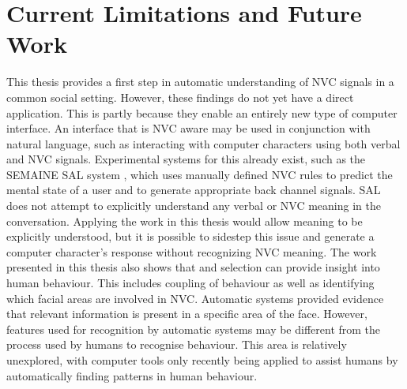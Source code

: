 

\section{Current Limitations and Future Work}

This thesis provides a first step in automatic understanding of \ac{NVC} signals in a common social setting. However, these findings do not yet have a direct application. This is partly because they enable an entirely new type of computer interface.
An interface that is \ac{NVC} aware may be used in conjunction with natural language, such as interacting with computer characters using both verbal and \ac{NVC} signals. Experimental systems for this already exist, such as the SEMAINE \acf{SAL} system \cite{Schroder2011}, which uses manually defined \ac{NVC} rules to predict the mental state of a user and to generate appropriate back channel signals. \ac{SAL} does not attempt to explicitly understand any verbal or \ac{NVC} meaning in the conversation. Applying the work in this thesis would allow meaning to be explicitly understood, but it is possible to sidestep this issue and generate a computer character's response without recognizing \ac{NVC} meaning. %
The work presented in this thesis also shows that \featureGeneration and selection can provide insight into human behaviour. This includes coupling of behaviour as well as identifying which facial areas are involved in \ac{NVC}. Automatic systems provided evidence that relevant information is present in a specific area of the face. However, features used for recognition by automatic systems may be different from the process used by humans to recognise behaviour. 
This area is relatively unexplored, with computer tools only recently being applied to assist humans by automatically finding patterns in human behaviour.

